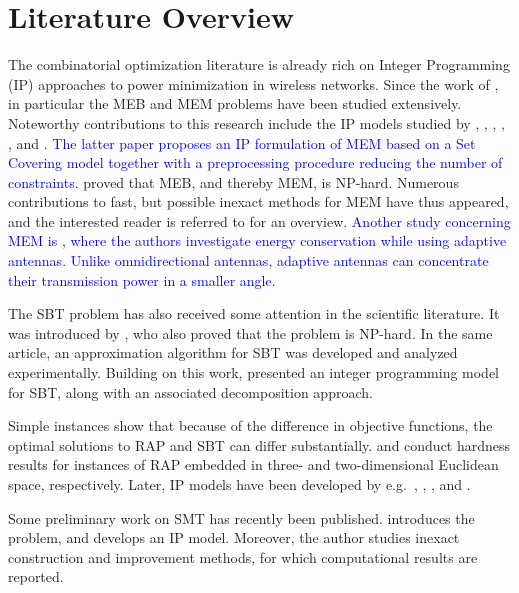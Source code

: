 \section{Literature Overview}
\label{sec:literature}
The combinatorial optimization literature is already rich on Integer Programming (IP) approaches to power minimization in wireless networks.
Since the work of \citet{Wieseltier00onthe}, in particular the MEB and MEM problems have been studied extensively.
Noteworthy contributions to this research include the IP models studied by \citet{das03},
\citet{altinkemer05}, \citet{yuan05}, \citet{yuan08}, \citet{bauer08}, \citet{montemanni11} and \citet{leggieri08}. 
\textcolor{blue}{
The latter paper proposes an IP formulation of MEM based on a Set Covering model together with a preprocessing procedure reducing the number of constraints.}
\citet{cagalj02} proved that MEB, and thereby MEM, is NP-hard.
Numerous contributions to fast, but possible inexact methods for MEM have thus appeared, and the interested reader is referred to \citep{hsiao13} for an overview. 
\textcolor{blue}{Another study concerning MEM is \cite{guo}, where the authors investigate energy conservation while using adaptive antennas. 
Unlike omnidirectional antennas, adaptive antennas can concentrate their transmission power in a smaller angle.}

The SBT problem has also received some attention in the scientific literature.
It was introduced by \citet{Papadimitriou06SBT}, who also proved that the problem is NP-hard.
In the same article, an approximation algorithm for SBT was developed and analyzed experimentally.
Building on this work, \citet{Haugland12Dual} presented an integer programming model for SBT, along with an associated decomposition approach.

Simple instances \citep{Haugland12Dual} show that because of the difference in objective functions, the optimal solutions to RAP and SBT can differ substantially.
\citet{kirousis97} and \citet{clementi99} conduct
hardness results for instances of RAP embedded in three- and two-dimensional Euclidean space, respectively.
Later, IP models have been developed by e.g.\ \citet{althaus03}, \citet{montemanni04}, \citet{das05}, and \citet{Haugland11Compact}.

Some preliminary work on SMT has recently been published.
\citet{ivanova16isco} introduces the problem, and develops an IP model.
Moreover, the author studies inexact construction and improvement methods, for which computational results are reported.
